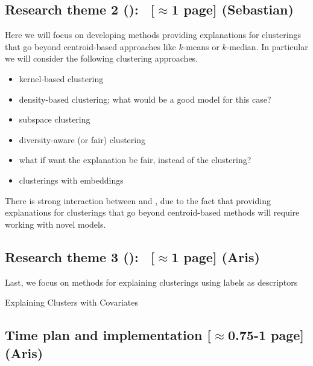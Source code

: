\documentclass[a4paper,11pt]{article}
\begin{document}
\subsection*{Research theme 2 (\rtw): \clusterings\ {\color{orange}[$\approx$1 page]} {\color{teal}(Sebastian)}}

Here we will focus on developing methods providing explanations for clusterings 
that go beyond centroid-based approaches like $k$-means or $k$-median.
In particular we will consider the following clustering approaches.
\begin{itemize}
\setlength{\itemsep}{-2pt}
\item kernel-based clustering
\item density-based clustering; what would be a good model for this case?
\item subspace clustering \hfill{}
\item diversity-aware (or fair) clustering \hfill{}
\item what if want the explanation be fair, instead of the clustering?
\item clusterings with embeddings
\end{itemize}

There is strong interaction between \rto and \rtw, 
due to the fact that providing explanations for clusterings that go beyond centroid-based methods
will require working with novel models.

\subsection*{Research theme 3 (\rth): \covariates\ {\color{orange}[$\approx$1 page]} {\color{teal}(Aris)}}

Last, we focus on methods for explaining clusterings using labels as descriptors


Explaining Clusters with Covariates


\subsection{Time plan and implementation {\color{orange}[$\approx$0.75-1 page]} {\color{teal}(Aris)}}

\end{document}
